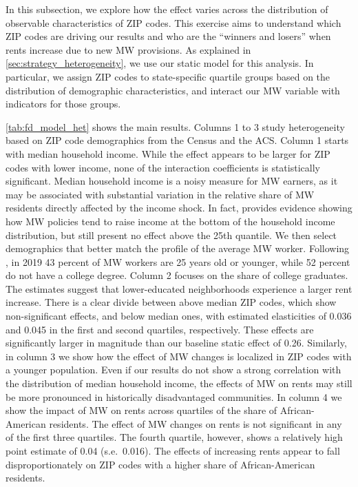 In this subsection, we explore how the effect varies across the distribution of observable 
characteristics of ZIP codes. This exercise aims to understand which ZIP codes are driving 
our results and who are the ``winners and losers'' when rents increase due to new MW provisions. 
As explained in \autoref{sec:strategy_heterogeneity}, we use our static model for this analysis. 
In particular, we assign ZIP codes to state-specific quartile groups based on the distribution of 
demographic characteristics, and interact our MW variable with indicators for those groups. 

\autoref{tab:fd_model_het} shows the main results. Columns 1 to 3 study heterogeneity based on 
ZIP code demographics from the Census and the ACS. Column 1 starts with median household income. 
While the effect appears to be larger for ZIP codes with lower income, none of the interaction 
coefficients is statistically significant. Median household income is a noisy measure for MW 
earners, as it may be associated with substantial variation in the relative share of MW residents 
directly affected by the income shock. In fact, \textcite{dube2019minimum} provides evidence 
showing how MW policies tend to raise income at the bottom of the household income distribution, 
but still present no effect above the 25th quantile.
We then select demographics that better match the profile of the average MW worker. Following 
\textcite{MinWorkersReportBLS}, in 2019 43 percent of MW workers are 25 years old or younger, 
while 52 percent do not have a college degree. Column 2 focuses on the share of college 
graduates. The estimates suggest that lower-educated neighborhoods experience a larger rent 
increase. There is a clear divide between above median ZIP codes, which show non-significant 
effects, and below median ones, with estimated elasticities of 0.036 and 0.045 in the first and 
second quartiles, respectively. These effects are significantly larger in magnitude than our 
baseline static effect of 0.26. Similarly, in column 3 we show how the effect of MW changes 
is localized in ZIP codes with a younger population. Even if our results do not show a strong 
correlation with the distribution of median household income, the effects of MW on rents may 
still be more pronounced in historically disadvantaged communities. In column 4 we show the 
impact of MW on rents across quartiles of the share of African-American residents. The effect 
of MW changes on rents is not significant in any of the first three quartiles. The fourth 
quartile, however, shows a relatively high point estimate of 0.04 (s.e.\ 0.016). The effects 
of increasing rents appear to fall disproportionately on ZIP codes with a higher share 
of African-American residents. 

